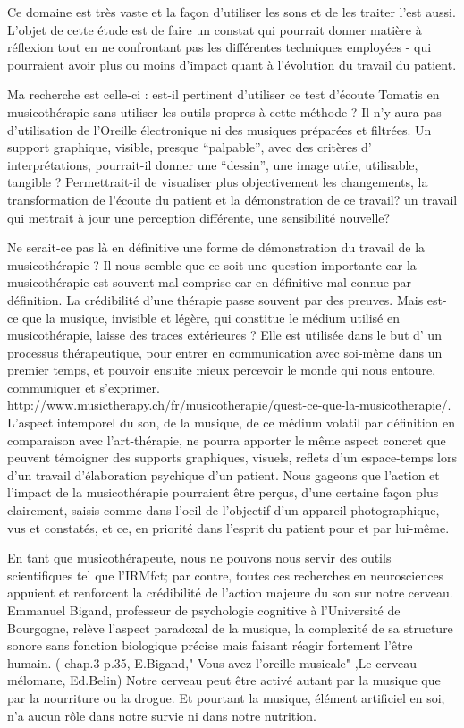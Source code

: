 Ce domaine est très vaste et la façon d'utiliser les sons et de les
traiter l'est aussi. L'objet de cette étude est de faire un constat
qui pourrait donner matière à réflexion tout en ne confrontant pas
les différentes techniques employées - qui pourraient avoir plus ou
moins d'impact quant à l'évolution du travail du patient.

Ma recherche est celle-ci : est-il pertinent d'utiliser ce test d'écoute
Tomatis en musicothérapie sans utiliser les outils propres à cette méthode ? Il n'y aura pas d'utilisation de l'Oreille électronique ni des musiques préparées et filtrées.
Un support graphique, visible, presque
``palpable'', avec des critères d' interprétations, pourrait-il
donner une ``dessin'', une image utile, utilisable, tangible ? Permettrait-il
de visualiser plus objectivement les changements, la transformation
de l'écoute du patient et la démonstration de ce travail? un travail
qui mettrait à jour une perception différente, une sensibilité nouvelle?

Ne serait-ce pas là en définitive une forme de démonstration du travail de la musicothérapie
?  Il nous semble que ce soit une question importante car la musicothérapie est  souvent mal comprise car en définitive mal connue par définition. La crédibilité d'une thérapie passe souvent par des preuves. Mais est-ce que la musique, invisible et légère,  qui constitue le médium utilisé en musicothérapie, laisse des traces extérieures ? Elle est utilisée dans le but d' un processus thérapeutique, pour entrer en communication avec soi-même dans un premier temps, et pouvoir ensuite mieux percevoir le monde qui nous entoure, communiquer et s'exprimer.  http://www.musictherapy.ch/fr/musicotherapie/quest-ce-que-la-musicotherapie/.  L'aspect intemporel du son, de la musique, de ce médium volatil par définition en comparaison avec l'art-thérapie, ne pourra apporter le même aspect concret que peuvent témoigner des supports graphiques, visuels, reflets d'un espace-temps lors d'un  travail d'élaboration psychique
d'un patient. 
Nous gageons que l'action et l'impact de la musicothérapie pourraient être perçus, d'une certaine façon plus clairement, saisis comme dans l'oeil de l'objectif d'un appareil photographique, vus et constatés, et ce, en priorité dans l'esprit du patient pour et par lui-même. 

En tant que musicothérapeute, nous ne pouvons nous servir des outils scientifiques tel que l'IRMfct; par contre, toutes ces recherches en neurosciences appuient et renforcent la crédibilité de l'action majeure du son sur notre cerveau.  Emmanuel Bigand, professeur de psychologie cognitive à l'Université de Bourgogne,  relève l'aspect paradoxal de la musique, la complexité de sa structure sonore sans fonction biologique précise mais faisant réagir fortement l'être humain. ( chap.3 p.35, E.Bigand," Vous avez l'oreille musicale" ,Le cerveau mélomane, Ed.Belin) Notre cerveau peut être activé autant par la musique que par la nourriture ou la drogue. Et pourtant la musique, élément artificiel en soi, n'a aucun rôle dans notre survie ni dans notre nutrition.



